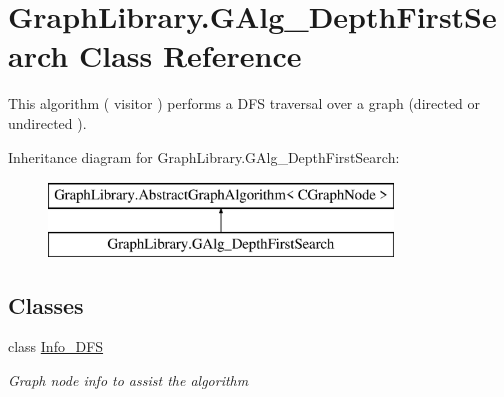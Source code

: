 \hypertarget{class_graph_library_1_1_g_alg___depth_first_search}{}\section{Graph\+Library.\+G\+Alg\+\_\+\+Depth\+First\+Search Class Reference}
\label{class_graph_library_1_1_g_alg___depth_first_search}


This algorithm ( visitor ) performs a D\+F\+S traversal over a graph (directed or undirected ).  


Inheritance diagram for Graph\+Library.\+G\+Alg\+\_\+\+Depth\+First\+Search\+:\begin{figure}[H]
\begin{center}
\leavevmode
\includegraphics[height=2.000000cm]{class_graph_library_1_1_g_alg___depth_first_search}
\end{center}
\end{figure}
\subsection*{Classes}
\begin{DoxyCompactItemize}
\item 
class \hyperlink{class_graph_library_1_1_g_alg___depth_first_search_1_1_info___d_f_s}{Info\+\_\+\+D\+F\+S}
\begin{DoxyCompactList}\small\item\em Graph node info to assist the algorithm \end{DoxyCompactList}\end{DoxyCompactItemize}
